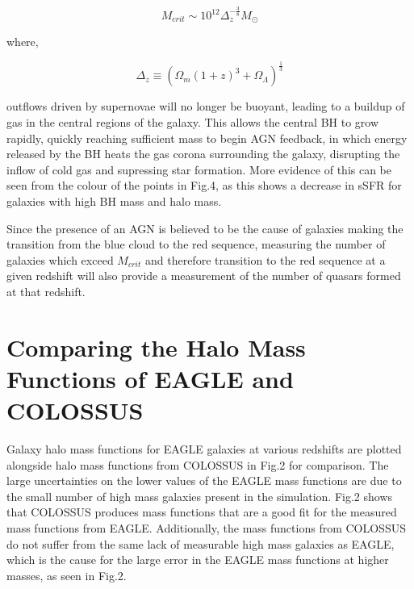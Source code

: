 \documentclass[12pt, twocolumn]{revtex4}    %
\begin{document}
\begin{equation}
    M_{crit}\sim10^{12}\Delta_{z}^{-\frac{3}{8}}M_\odot
\end{equation}

\noindent where,

\begin{equation}
    \Delta_z\equiv(\Omega_m(1+z)^3+\Omega_\Lambda)^{\frac{1}{3}}
\end{equation}

\noindent outflows driven by supernovae will no longer be buoyant, leading to a buildup of gas in the central regions of the galaxy. This allows the central BH to grow rapidly, quickly reaching sufficient mass to begin AGN feedback, in which energy released by the BH heats the gas corona surrounding the galaxy, disrupting the inflow of cold gas and supressing star formation. More evidence of this can be seen from the colour of the points in Fig.4, as this shows a decrease in sSFR for galaxies with high BH mass and halo mass.\par

Since the presence of an AGN is believed to be the cause of galaxies making the transition from the blue cloud to the red sequence, measuring the number of galaxies which exceed $M_{crit}$ and therefore transition to the red sequence at a given redshift will also provide a measurement of the number of quasars formed at that redshift.

\section{Comparing the Halo Mass Functions of EAGLE and COLOSSUS}

Galaxy halo mass functions for EAGLE galaxies at various redshifts are plotted alongside halo mass functions from COLOSSUS in Fig.2 for comparison. The large uncertainties on the lower values of the EAGLE mass functions are due to the small number of high mass galaxies present in the simulation. Fig.2 shows that COLOSSUS produces mass functions that are a good fit for the measured mass functions from EAGLE. Additionally, the mass functions from COLOSSUS do not suffer from the same lack of measurable high mass galaxies as EAGLE, which is the cause for the large error in the EAGLE mass functions at higher masses, as seen in Fig.2.
\end{document}
